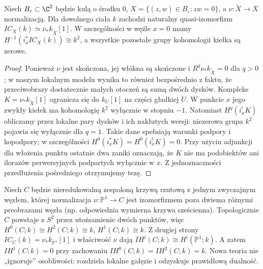 \begin{stwierdzenie}
\label{prop:node-ic-xiii}
Niech $B_\varepsilon\subset\C^2$ będzie kulą o środku $0$,
$X=\{(z,w)\in B_\varepsilon:zw=0\}$, a
$\nu:\widetilde X\to X$ normalizacją.
Dla dowolnego ciała $k$ zachodzi naturalny quasi-izomorfizm
$IC_X(k)\simeq\nu_*k_{\widetilde X}[1]$.
W szczególności w węźle $x=0$ mamy
$H^{-1}(i_x^*IC_X(k))\cong k^2$,
a wszystkie pozostałe grupy kohomologii kiełka
są zerowe.
\end{stwierdzenie}
\begin{proof}
Ponieważ $\nu$ jest skończona, jej włókna są
skończone i $R^q\nu_*k_{\widetilde X}=0$ dla $q>0$;
w naszym lokalnym modelu wynika to również
bezpośrednio z faktu, że przeciwobrazy dostatecznie
małych otoczeń są sumą dwóch dysków.
Kompleks $K=\nu_*k_{\widetilde X}[1]$ ogranicza się
do $k_U[1]$ na części gładkiej $U$.
W punkcie $x$ jego zwykły kiełek ma kohomologię
$k^2$ wyłącznie w stopniu $-1$. Natomiast
$H^q(i_x^!K)$ obliczamy przez lokalne pary
dysków i ich nakłutych wersji: niezerowa grupa
$k^2$ pojawia się wyłącznie dla $q=1$.
Takie dane spełniają warunki podpory i kopodpory;
w szczególności $H^0(i_x^*K)=H^0(i_x^!K)=0$.
Przy użyciu adjunkcji dla włożenia punktu
ostatnie dwa zaniki oznaczają, że $K$ nie ma
podobiektów ani ilorazów perwersyjnych
podpartych wyłącznie w $x$. Z jednoznaczności
przedłużenia pośredniego otrzymujemy tezę.
\end{proof}

\begin{przyklad}
Niech $C$ będzie nieredukowalną zespoloną
krzywą rzutową z jednym zwyczajnym węzłem,
której normalizacja $\nu:\mathbb P^1\to C$
jest izomorfizmem poza dwiema różnymi preobrazami
węzła (np. odpowiednia wymierna krzywa sześcienna).
Topologicznie $C$ powstaje z $S^2$ przez
utożsamienie dwóch punktów, więc
$H^0(C;k)\cong H^2(C;k)\cong k$,
$H^1(C;k)\cong k$.
Z drugiej strony
$IC_C(k)=\nu_*k_{\mathbb P^1}[1]$ i właściwość $\nu$
dają $IH^i(C;k)\cong H^i(\mathbb P^1;k)$.
A zatem $IH^1(C;k)=0$ przy zachowaniu
$IH^0(C;k)=IH^2(C;k)=k$.
Nowa teoria nie „ignoruje” osobliwości: rozdziela
lokalne gałęzie i odzyskuje prawidłową dualność.
\end{przyklad}

